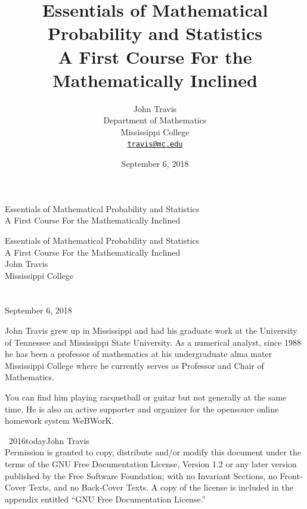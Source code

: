 \documentclass[10pt,]{book}
\title{Essentials of Mathematical Probability and Statistics\\
{\large A First Course For the Mathematically Inclined}}
\author{John Travis\\
Department of Mathematics\\
Mississippi College\\
\href{mailto:travis@mc.edu}{\nolinkurl{travis@mc.edu}}
}
\date{September 6, 2018}
\theoremstyle{plain}
\theoremstyle{definition}
\theoremstyle{definition}
\theoremstyle{definition}
\numberwithin{equation}{section}
\begin{document}
\frontmatter
\thispagestyle{empty}
{\centering
\vspace*{0.28\textheight}
{\Huge Essentials of Mathematical Probability and Statistics}\\[2\baselineskip]
{\LARGE A First Course For the Mathematically Inclined}\\
}
\clearpage
\thispagestyle{empty}
\null%
\clearpage
\thispagestyle{empty}
{\centering
\vspace*{0.14\textheight}
{\Huge Essentials of Mathematical Probability and Statistics}\\[\baselineskip]
{\LARGE A First Course For the Mathematically Inclined}\\[3\baselineskip]
{\Large John Travis}\\[0.5\baselineskip]
{\Large Mississippi College}\\[3\baselineskip]
{\Large }\\[0.5\baselineskip]
{\normalsize }\\[3\baselineskip]
{\Large September 6, 2018}\\}
\clearpage
\thispagestyle{empty}
\noindent
John Travis grew up in Mississippi and had his graduate work at the University of Tennessee and Mississippi State University. As a numerical analyst, since 1988 he has been a professor of mathematics at his undergraduate alma mater Mississippi College where he currently serves as Professor and Chair of Mathematics.%
\par
You can find him playing racquetball or guitar but not generally at the same time. He is also an active supporter and organizer for the opensouce online homework system WeBWorK.%
\par
{}
\noindent\textcopyright\ 2016\textendash{}today\quad{}John Travis\\[0.5\baselineskip]
Permission is granted to copy, distribute and/or modify this document under the terms of the GNU Free Documentation License, Version 1.2 or any later version published by the Free Software Foundation; with no Invariant Sections, no Front-Cover Texts, and no Back-Cover Texts.  A copy of the license is included in the appendix entitled ``GNU Free Documentation License.''\par\medskip
{}
\null\clearpage
\end{document}
